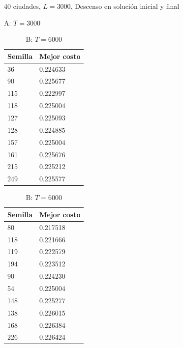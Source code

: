 \documentclass{article}
\begin{document}
  \begin{table}[!htb]
    \caption{40 ciudades, 
             $L=3000$, 
             Descenso en solución inicial y final}
    \begin{minipage}{.5\linewidth}
      \caption{A: $T= 3000$}
      \centering
      \begin{tabular}{l|l}
        Semilla & Mejor costo \\
        \hline
        36      & 0.224633    \\
        \hline
        90      & 0.225677    \\
        \hline
        115     & 0.222997    \\
        \hline
        118     & 0.225004    \\
        \hline
        127     & 0.225093    \\
        \hline
        128     & 0.224885    \\
        \hline
        157     & 0.225004    \\
        \hline
        161     & 0.225676    \\
        \hline
        215     & 0.225212    \\
        \hline
        249     & 0.225577    \\
      \end{tabular}
    \end{minipage}%
    \begin{minipage}{.5\linewidth}
      \centering
      \caption{B: $T=6000$}
      \begin{tabular}{l|l}
        Semilla & Mejor costo \\
        \hline
        80      & 0.217518 \\
        \hline
        118     & 0.221666 \\
        \hline
        119     & 0.222579 \\
        \hline
        194     & 0.223512 \\
        \hline
        90      & 0.224230 \\
        \hline
        54      & 0.225004 \\
        \hline
        148     & 0.225277 \\
        \hline
        138     & 0.226015 \\
        \hline
        168     & 0.226384 \\
        \hline
        226     & 0.226424 \\
      \end{tabular}
    \end{minipage}

\end{table}
\end{document}
